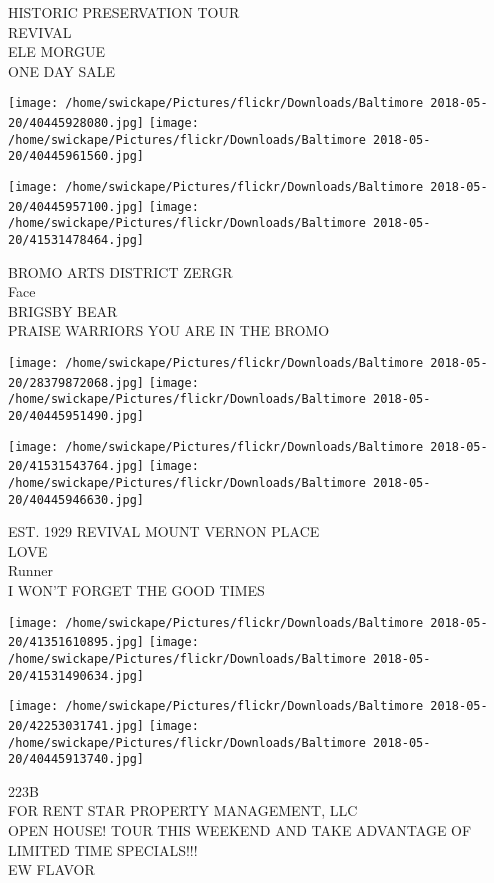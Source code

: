 \documentclass[10pt,letterpaper]{article}
\begin{document}
HISTORIC PRESERVATION TOUR\\
REVIVAL\\
ELE MORGUE\\
ONE DAY SALE\\
\pagebreak

\texttt{[image: /home/swickape/Pictures/flickr/Downloads/Baltimore 2018-05-20/40445928080.jpg]}
\texttt{[image: /home/swickape/Pictures/flickr/Downloads/Baltimore 2018-05-20/40445961560.jpg]}

\texttt{[image: /home/swickape/Pictures/flickr/Downloads/Baltimore 2018-05-20/40445957100.jpg]}
\texttt{[image: /home/swickape/Pictures/flickr/Downloads/Baltimore 2018-05-20/41531478464.jpg]}

BROMO ARTS DISTRICT ZERGR\\
Face\\
BRIGSBY BEAR\\
PRAISE WARRIORS YOU ARE IN THE BROMO\\
\pagebreak

\texttt{[image: /home/swickape/Pictures/flickr/Downloads/Baltimore 2018-05-20/28379872068.jpg]}
\texttt{[image: /home/swickape/Pictures/flickr/Downloads/Baltimore 2018-05-20/40445951490.jpg]}

\texttt{[image: /home/swickape/Pictures/flickr/Downloads/Baltimore 2018-05-20/41531543764.jpg]}
\texttt{[image: /home/swickape/Pictures/flickr/Downloads/Baltimore 2018-05-20/40445946630.jpg]}

EST. 1929 REVIVAL MOUNT VERNON PLACE\\
LOVE\\
Runner\\
I WON'T FORGET THE GOOD TIMES\\
\pagebreak

\texttt{[image: /home/swickape/Pictures/flickr/Downloads/Baltimore 2018-05-20/41351610895.jpg]}
\texttt{[image: /home/swickape/Pictures/flickr/Downloads/Baltimore 2018-05-20/41531490634.jpg]}

\texttt{[image: /home/swickape/Pictures/flickr/Downloads/Baltimore 2018-05-20/42253031741.jpg]}
\texttt{[image: /home/swickape/Pictures/flickr/Downloads/Baltimore 2018-05-20/40445913740.jpg]}

223B\\
FOR RENT STAR PROPERTY MANAGEMENT, LLC\\
OPEN HOUSE!  TOUR THIS WEEKEND AND TAKE ADVANTAGE OF LIMITED TIME SPECIALS!!!\\
EW FLAVOR\\
\pagebreak
\end{document}
